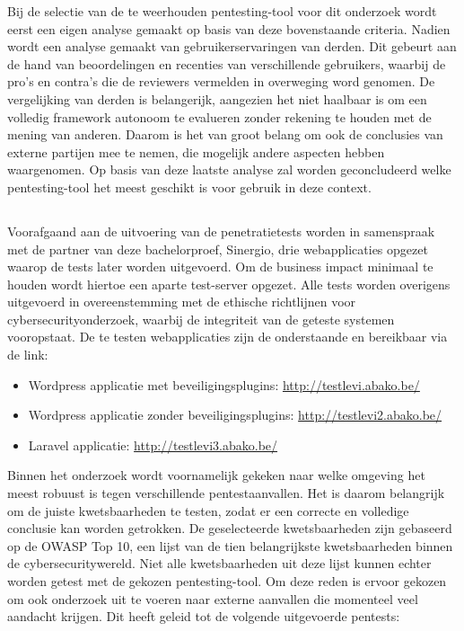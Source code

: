 Bij de selectie van de te weerhouden pentesting-tool voor dit onderzoek wordt eerst een eigen analyse gemaakt op basis van deze bovenstaande criteria. 
Nadien wordt een analyse gemaakt van gebruikerservaringen van derden. Dit gebeurt aan de hand van beoordelingen en recenties van 
verschillende gebruikers, waarbij de pro's en contra's die de reviewers vermelden in overweging word genomen. De vergelijking 
van derden is belangerijk, aangezien het niet haalbaar is om een volledig framework 
autonoom te evalueren zonder rekening te houden met de mening van anderen. Daarom is het van groot belang om ook de conclusies van externe partijen mee te nemen, die mogelijk andere 
aspecten hebben waargenomen. Op basis van 
deze laatste analyse zal worden geconcludeerd welke pentesting-tool het meest geschikt is voor gebruik in deze context.

\subsection{}
Voorafgaand aan de uitvoering van de penetratietests worden in samenspraak met de partner van deze bachelorproef, Sinergio, drie 
webapplicaties opgezet waarop de tests later worden uitgevoerd. Om de business impact minimaal te houden wordt hiertoe een 
aparte test-server opgezet. Alle tests worden overigens uitgevoerd in overeenstemming met de ethische 
richtlijnen voor cybersecurityonderzoek, waarbij de integriteit van de geteste systemen vooropstaat. De te testen 
webapplicaties zijn de onderstaande en bereikbaar via de link:

\begin{itemize}
    \item Wordpress applicatie met beveiligingsplugins: \url{http://testlevi.abako.be/}
    \item Wordpress applicatie zonder beveiligingsplugins: \url{http://testlevi2.abako.be/}
    \item Laravel applicatie: \url{http://testlevi3.abako.be/}
\end{itemize}

Binnen het onderzoek wordt voornamelijk gekeken naar welke omgeving het meest robuust is tegen verschillende pentestaanvallen. 
Het is daarom belangrijk om de juiste kwetsbaarheden te testen, zodat er een correcte en volledige conclusie kan worden 
getrokken. De geselecteerde kwetsbaarheden zijn gebaseerd op de OWASP Top 10, een lijst van de tien belangrijkste 
kwetsbaarheden binnen de cybersecuritywereld. Niet alle kwetsbaarheden uit deze lijst kunnen echter worden getest met de 
gekozen pentesting-tool. Om deze reden is ervoor gekozen om ook onderzoek uit te voeren naar externe aanvallen die momenteel veel 
aandacht krijgen. Dit heeft geleid tot de volgende uitgevoerde pentests:

